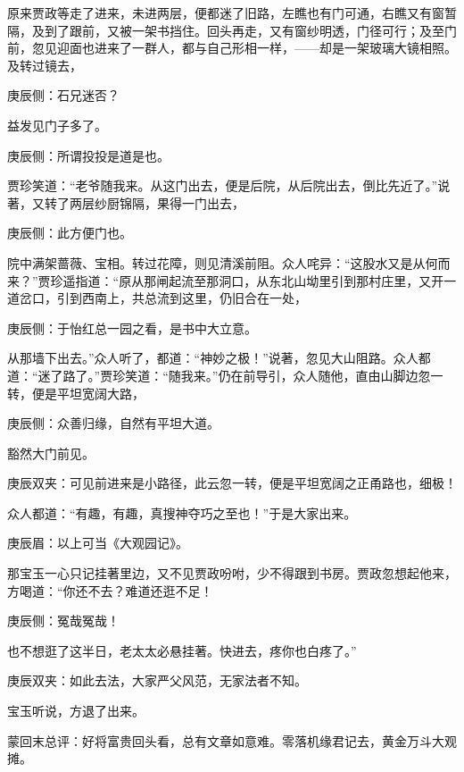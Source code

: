 \begin{parag}
    原来贾政等走了进来，未进两层，便都迷了旧路，左瞧也有门可通，右瞧又有窗暂隔，及到了跟前，又被一架书挡住。回头再走，又有窗纱明透，门径可行；及至门前，忽见迎面也进来了一群人，都与自己形相一样，——却是一架玻璃大镜相照。及转过镜去，\begin{note}庚辰侧：石兄迷否？\end{note}益发见门子多了。\begin{note}庚辰侧：所谓投投是道是也。\end{note}贾珍笑道：“老爷随我来。从这门出去，便是后院，从后院出去，倒比先近了。”说著，又转了两层纱厨锦隔，果得一门出去，\begin{note}庚辰侧：此方便门也。\end{note}院中满架蔷薇、宝相。转过花障，则见清溪前阻。众人咤异：“这股水又是从何而来？”贾珍遥指道：“原从那闸起流至那洞口，从东北山坳里引到那村庄里，又开一道岔口，引到西南上，共总流到这里，仍旧合在一处，\begin{note}庚辰侧：于怡红总一园之看，是书中大立意。\end{note}从那墙下出去。”众人听了，都道：“神妙之极！”说著，忽见大山阻路。众人都道：“迷了路了。”贾珍笑道：“随我来。”仍在前导引，众人随他，直由山脚边忽一转，便是平坦宽阔大路，\begin{note}庚辰侧：众善归缘，自然有平坦大道。\end{note}豁然大门前见。\begin{note}庚辰双夹：可见前进来是小路径，此云忽一转，便是平坦宽阔之正甬路也，细极！\end{note}众人都道：“有趣，有趣，真搜神夺巧之至也！”于是大家出来。\begin{note}庚辰眉：以上可当《大观园记》。\end{note}那宝玉一心只记挂著里边，又不见贾政吩咐，少不得跟到书房。贾政忽想起他来，方喝道：“你还不去？难道还逛不足！\begin{note}庚辰侧：冤哉冤哉！\end{note}也不想逛了这半日，老太太必悬挂著。快进去，疼你也白疼了。”\begin{note}庚辰双夹：如此去法，大家严父风范，无家法者不知。\end{note}宝玉听说，方退了出来。
\end{parag}


\begin{parag}
    \begin{note}蒙回末总评：好将富贵回头看，总有文章如意难。零落机缘君记去，黄金万斗大观摊。\end{note}
\end{parag}

